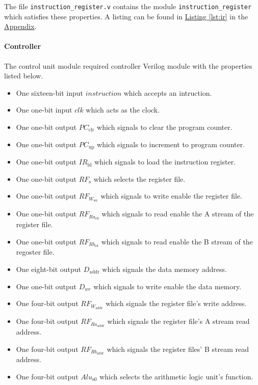 The file \verb|instruction_register.v| contains the module \verb|instruction_register| which satisfies these properties.
A listing can be found in \hyperref[lst:ir]{Listing \ref*{lst:ir}} in the \hyperref[sec:appendix]{Appendix}.

\paragraph{Controller} \label{par:controller}

The control unit module required controller Verilog module with the properties listed below.

\begin{itemize}
    \item One sixteen-bit input $instruction$ which accepts an intruction.
    \item One one-bit input $clk$ which acts as the clock.
    \item One one-bit output $PC_\text{clr}$ which signals to clear the program counter.
    \item One one-bit output $PC_\text{up}$ which signals to increment to program counter.
    \item One one-bit output $IR_\text{ld}$ which signals to load the instruction register.
    \item One one-bit output $RF_\text{s}$ which selects the register file.
    \item One one-bit output $RF_{W_\text{wr}}$ which signals to write enable the register file.
    \item One one-bit output $RF_{Ra_\text{rd}}$ which signals to read enable the A stream of the register file.
    \item One one-bit output $RF_{Rb_\text{rd}}$ which signals to read enable the B stream of the regoster file.
    \item One eight-bit output $D_\text{addr}$ which signals the data memory address.
    \item One one-bit output $D_{wr}$ which signals to write enable the data memory.
    \item One four-bit output $RF_{W_\text{addr}}$ which signals the register file's write address.
    \item One four-bit output $RF_{Ra_\text{addr}}$ which signals the register file's A stream read address.
    \item One four-bit output $RF_{Rb_\text{addr}}$ which signals the register files' B stream read address.
    \item One four-bit output $Alu_\text{s0}$ which selects the arithmetic logic unit's function.

\end{itemize}
